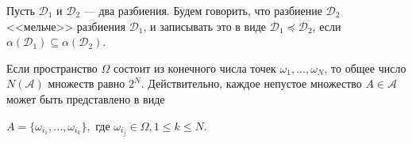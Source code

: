 \documentclass{article}
\begin{document}
Пусть $\mathscr D_1$ и $\mathscr D_2$ --- два разбиения. Будем говорить, что разбиение $\mathscr D_2$ <<мельче>> разбиения $\mathscr D_1$, и записывать это в виде $\mathscr D_1 \preccurlyeq \mathscr D_2$, если $\alpha(\mathscr D_1)\subseteq\alpha(\mathscr D_2)$.

Если пространство $\Omega$ состоит из конечного числа точек $\omega_1,...,\omega_N$, то общее число $N(\mathscr A)$ множеств равно $2^N$. Действительно, каждое непустое множество $A\in\mathscr A$ может быть представлено в виде
\begin{center}
$A=\{\omega_{i_1},...,\omega_{i_k}\},$
где
$\omega_{i_j}\in\Omega, 1\leqslant k \leqslant N$.
\end{center}





\end{document}
